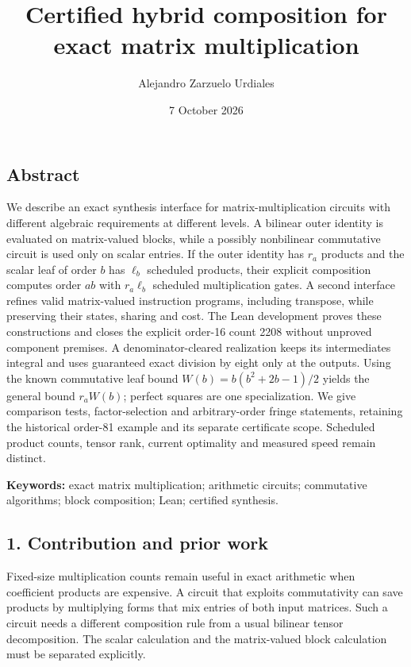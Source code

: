 \documentclass[
  11pt,
]{article}
\title{Certified hybrid composition for exact matrix multiplication}
\author{Alejandro Zarzuelo Urdiales}
\date{7 October 2026}
\begin{document}
\maketitle

\subsection{Abstract}\label{abstract}

We describe an exact synthesis interface for matrix-multiplication
circuits with different algebraic requirements at different levels. A
bilinear outer identity is evaluated on matrix-valued blocks, while a
possibly nonbilinear commutative circuit is used only on scalar entries.
If the outer identity has \(r_a\) products and the scalar leaf of order
\(b\) has \(\ell_b\) scheduled products, their explicit composition
computes order \(ab\) with \(r_a\ell_b\) scheduled multiplication gates.
A second interface refines valid matrix-valued instruction programs,
including transpose, while preserving their states, sharing and cost.
The Lean development proves these constructions and closes the explicit
order-16 count 2208 without unproved component premises. A
denominator-cleared realization keeps its intermediates integral and
uses guaranteed exact division by eight only at the outputs. Using the
known commutative leaf bound \(W(b)=b(b^2+2b-1)/2\) yields the general
bound \(r_aW(b)\); perfect squares are one specialization. We give
comparison tests, factor-selection and arbitrary-order fringe
statements, retaining the historical order-81 example and its separate
certificate scope. Scheduled product counts, tensor rank, current
optimality and measured speed remain distinct.

\textbf{Keywords:} exact matrix multiplication; arithmetic circuits;
commutative algorithms; block composition; Lean; certified synthesis.

\subsection{1. Contribution and prior
work}\label{contribution-and-prior-work}

Fixed-size multiplication counts remain useful in exact arithmetic when
coefficient products are expensive. A circuit that exploits
commutativity can save products by multiplying forms that mix entries of
both input matrices. Such a circuit needs a different composition rule
from a usual bilinear tensor decomposition. The scalar calculation and
the matrix-valued block calculation must be separated explicitly.
\end{document}
